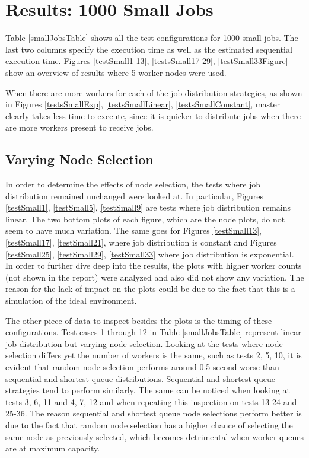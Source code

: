 \documentclass{article}
\begin{document}
\newpage



\section{Results: 1000 Small Jobs} \label{1000SmallJobs}

Table \ref{smallJobsTable} shows all the test configurations for 1000 small jobs. The last two columns specify the execution time as well as the estimated sequential execution time. Figures \ref{testSmall1-13}, \ref{testsSmall17-29}, \ref{testSmall33Figure} show an overview of results where 5 worker nodes were used.

When there are more workers for each of the job distribution strategies, as shown in Figures \ref{testsSmallExp}, \ref{testsSmallLinear}, \ref{testsSmallConstant}, master clearly takes less time to execute, since it is quicker to distribute jobs when there are more workers present to receive jobs.

\subsection{Varying Node Selection} \label{smallNodeSelection}
In order to determine the effects of node selection, the tests where job distribution remained unchanged were looked at. In particular, Figures \ref{testSmall1}, \ref{testSmall5}, \ref{testSmall9} are tests where job distribution remains linear. The two bottom plots of each figure, which are the node plots, do not seem to have much variation. The same goes for Figures \ref{testSmall13}, \ref{testSmall17}, \ref{testSmall21}, where job distribution is constant and Figures \ref{testSmall25}, \ref{testSmall29}, \ref{testSmall33} where job distribution is exponential. In order to further dive deep into the results, the plots with higher worker counts (not shown in the report) were analyzed and also did not show any variation. The reason for the lack of impact on the plots could be due to the fact that this is a simulation of the ideal environment.

The other piece of data to inspect besides the plots is the timing of these configurations. Test cases 1 through 12 in Table \ref{smallJobsTable} represent linear job distribution but varying node selection. Looking at the tests where node selection differs yet the number of workers is the same, such as tests 2, 5, 10, it is evident that random node selection performs around 0.5 second worse than sequential and shortest queue distributions. Sequential and shortest queue strategies tend to perform similarly. The same can be noticed when looking at tests 3, 6, 11 and 4, 7, 12 and when repeating this inspection on tests 13-24 and 25-36. The reason sequential and shortest queue node selections perform better is due to the fact that random node selection has a higher chance of selecting the same node as previously selected, which becomes detrimental when worker queues are at maximum capacity.
\end{document}
